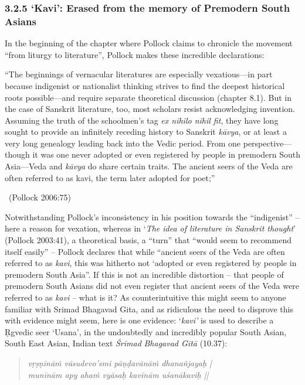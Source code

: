 \subsubsection*{3.2.5 ‘Kavi’: Erased from the memory of Premodern South Asians}

\vskip -7pt

In the beginning of the chapter where Pollock claims to chronicle the movement “from liturgy to literature”, Pollock makes these incredible declarations:

\begin{myquote}
“The beginnings of vernacular literatures are especially vexatious—in part because indigenist or nationalist thinking strives to find the deepest historical roots possible—and require separate theoretical discussion (chapter 8.1). But in the case of Sanskrit literature, too, most scholars resist acknowledging invention. Assuming the truth of the schoolmen’s tag \textit{ex nihilo nihil fit}, they have long sought to provide an infinitely receding history to Sanskrit \textit{kāvya}, or at least a very long genealogy leading back into the Vedic period. From one perspective—though it was one never adopted or even registered by people in premodern South Asia—Veda and \textit{kāvya} do share certain traits. The ancient seers of the Veda are often referred to as kavi, the term later adopted for poet;”

~\hfill (Pollock 2006:75)
\end{myquote}

Notwithstanding Pollock’s inconsistency in his position towards the “indigenist” – here a reason for vexation, whereas in ‘\textit{The idea of literature in Sanskrit thought}’ (Pollock 2003:41), a theoretical basis, a “turn” that “would seem to recommend itself easily” – Pollock declares that while “ancient seers of the Veda are often referred to as \textit{kavi}, this was hitherto not ‘adopted or even registered by people in premodern South Asia”. If this is not an incredible distortion – that people of premodern South Asians did not even register that ancient seers of the Veda were referred to as \textit{kavi} – what is it? As counterintuitive this might seem to anyone familiar with Srimad Bhagavad Gita, and as ridiculous the need to disprove this with evidence might seem, here is one evidence: ‘\textit{kavi’} is used to describe a Ṛgvedic seer ‘Usana’, in the undoubtedly and incredibly popular South Asian, South East Asian, Indian text \textit{Śrīmad} \textit{Bhagavad Gītā} (10.37):

\begin{verse}
\textit{vṛṣṇīnāṁ vāsudevo’smi pāṇḍavānāṁ dhanañjayaḥ |}\\\textit{munīnām apy ahaṁ vyāsaḥ kavīnām uśanākaviḥ ||}
\end{verse}

